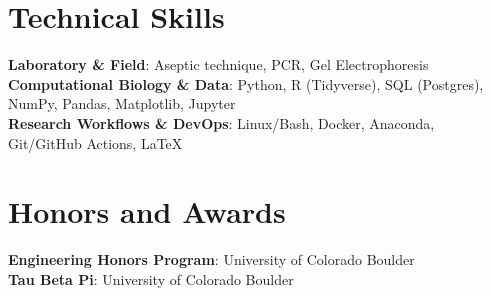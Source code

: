 \documentclass[letterpaper,11pt]{article}
\begin{document}
\section{Technical Skills}
\begin{itemize}[leftmargin=0.15in, label={}]
	\small{\item{
		            \textbf{Laboratory \& Field}{: Aseptic technique, PCR, Gel Electrophoresis} \\
		            \textbf{Computational Biology \& Data}{: Python, R (Tidyverse), SQL (Postgres), NumPy, Pandas, Matplotlib, Jupyter} \\
		            \textbf{Research Workflows \& DevOps}{: Linux/Bash, Docker, Anaconda, Git/GitHub Actions, \LaTeX}
		      }}
\end{itemize}

\section{Honors and Awards}
\begin{itemize}[leftmargin=0.15in, label={}]
	\small{\item{
		            \textbf{Engineering Honors Program}{: University of Colorado Boulder}\\
		            \textbf{Tau Beta Pi}{: University of Colorado Boulder}\\
		      }}
\end{itemize}
\end{document}
